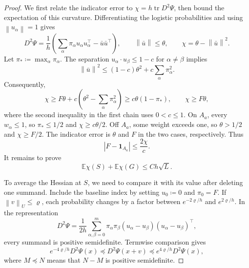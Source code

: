 \documentclass[11pt,letterpaper]{article}
\theoremstyle{remark}
\newcommand{\E}{\mathbb E}
\newcommand{\tr}{\operatorname{tr}}
\newcommand{\norm}[1]{\left\lVert#1\right\rVert}
\newcommand{\ind}{\mathbf 1}
\begin{document}
\begin{proof}
We first relate the indicator error to \(\chi=h\tr D^2\Psi\),
then bound the expectation of this curvature. Differentiating the
logistic probabilities and using \(\norm{u_\alpha}=1\) gives
\begin{equation}
 D^2\Psi=\frac1h\left(
 \sum_\alpha\pi_\alpha u_\alpha u_\alpha^\top-\bar u\bar u^\top\right),
 \qquad \norm{\bar u}\le\theta,\qquad
 \chi=\theta-\norm{\bar u}^2.
 \label{appx-eq:hessian}
\end{equation}
Let \(\pi_*\coloneqq\max_\alpha\pi_\alpha\). The separation
\(u_\alpha\cdot u_\beta\le1-c\) for \(\alpha\ne\beta\) implies
\[
 \norm{\bar u}^2
 \le(1-c)\theta^2+c\sum_\alpha\pi_\alpha^2.
\]
Consequently,
\[
 \chi\ge F\theta+c\left(\theta^2-\sum_\alpha\pi_\alpha^2\right)
 \ge c\theta(1-\pi_*),\qquad \chi\ge F\theta,
\]
where the second inequality in the first chain uses \(0<c\le1\).
On \(A_a\), every \(w_\alpha\le1\), so \(\pi_*\le1/2\)
and \(\chi\ge c\theta/2\). Off \(A_a\), some weight exceeds
one, so \(\theta>1/2\) and \(\chi\ge F/2\).
The indicator error is \(\theta\) and \(F\) in the two cases,
respectively. Thus
\begin{equation}
 |F-\ind_{A_a}|\le\frac{2\chi}{c}.
 \label{appx-eq:curvature-error}
\end{equation}
It remains to prove
\begin{equation}
 \E\chi(S)+\E\chi(G)\le Ch\sqrt L.
 \label{appx-eq:gap-contraction}
\end{equation}

To average the Hessian at \(S\), we need to compare it with its value
after deleting one summand. Include the baseline index by setting
\(u_0\coloneqq0\) and \(\pi_0=F\). If \(\norm v_U\le\varrho\), each probability
changes by a factor between \(e^{-2\varrho/h}\) and
\(e^{2\varrho/h}\). In the representation
\[
 D^2\Psi=\frac1{2h}\sum_{\alpha,\beta=0}^m
 \pi_\alpha\pi_\beta
 (u_\alpha-u_\beta)(u_\alpha-u_\beta)^\top,
\]
every summand is positive semidefinite. Termwise comparison gives
\[
 e^{-4\varrho/h}D^2\Psi(x)\preceq D^2\Psi(x+v)
 \preceq e^{4\varrho/h}D^2\Psi(x),
\]
where \(M\preceq N\) means that \(N-M\) is positive semidefinite.


\end{proof}
\end{document}
